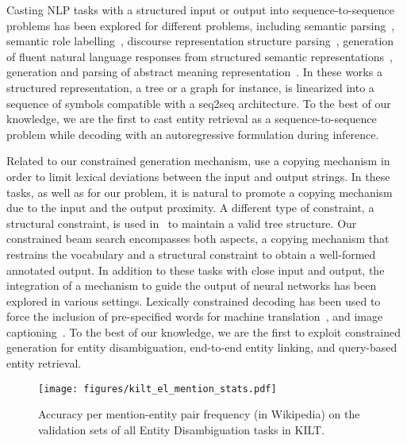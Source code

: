 \documentclass{article} \usepackage{main,times}
\begin{document}
Casting NLP tasks with a structured input or output into sequence-to-sequence problems has been explored for different problems, including semantic parsing~\citep{rongali2020dontparse}, semantic role labelling~\citep{daza2018sequence}, discourse representation structure parsing~\citep{liu-etal-2018-discourse}, generation of fluent natural language responses from structured semantic representations~\citep{balakrishnan-etal-2019-constrained}, generation and parsing of abstract meaning representation~\citep{konstas-etal-2017-neural}. In these works a structured representation, a tree or a graph for instance, is linearized into a sequence of symbols compatible with a seq2seq architecture. 
To the best of our knowledge, we are the first to cast entity retrieval as a sequence-to-sequence problem while decoding with an autoregressive formulation during inference. 


Related to our constrained generation mechanism, \cite{daza2018sequence, rongali2020dontparse} use a copying mechanism in order to limit lexical deviations between the input and output strings. In these tasks, as well as for our problem, it is natural to promote a copying mechanism due to the input and the output proximity. A different type of constraint, a structural constraint, is used in~\cite{balakrishnan-etal-2019-constrained} to maintain a valid tree structure. Our constrained beam search encompasses both aspects, a copying mechanism that restrains the vocabulary and a structural constraint to obtain a well-formed annotated output. 
In addition to these tasks with close input and output, the integration of a mechanism to guide the output of neural networks has been explored in various settings. Lexically constrained decoding has been used to force the inclusion of pre-specified words for machine translation~\citep{hokamp-liu-2017-lexically, post-vilar-2018-fast}, and image captioning~\citep{anderson-etal-2017-guided}. To the best of our knowledge, we are the first to exploit constrained generation for entity disambiguation, end-to-end entity linking, and query-based entity retrieval.

\begin{figure}[t]
    \centering
    \texttt{[image: figures/kilt\_el\_mention\_stats.pdf]}
    \caption{Accuracy per mention-entity pair frequency (in Wikipedia) on the validation sets of all Entity Disambiguation tasks in KILT.}
    \label{fig:kilt_el_mention_stats}
\end{figure}
\end{document}
